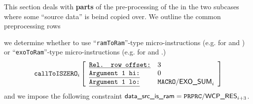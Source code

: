 \begin{center}
\end{center}
This section deals with \textbf{parts} of the pre-processing of the \mmuInstAnyToRamWithPadding{}
in the two subcases where some ``source data'' is beind copied over.
We outline the common preprocessing rows
\begin{description}
	\def\rowNum{3} \item[Processing row $n^\circ(i + \rowNum)$:]
		we determine whether to use
		``\texttt{ramToRam}''-type micro-instructions (e.g. for  and ) or
		``\texttt{exoToRam}''-type micro-instructions (e.g. for  and .)
		\[
			\callToIszero
			{i}{\rowNum}
			{0}{\macroExoSum_{i}}
		\]
		and we impose the following constraint $\locDataSourceIsRam = \ppWcpRes_{i + \rowNum}$.


\end{description}
